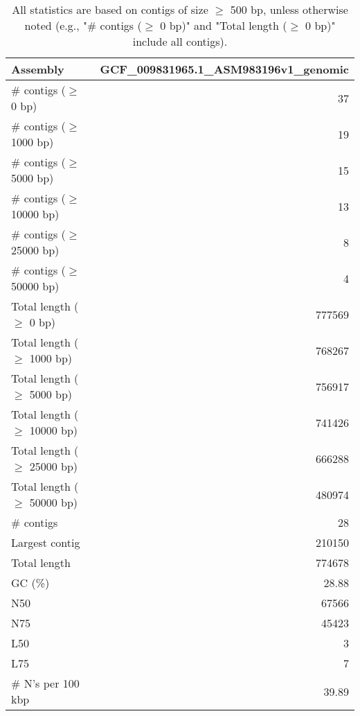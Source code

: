\documentclass[12pt,a4paper]{article}
\begin{document}
\begin{table}[ht]
\begin{center}
\caption{All statistics are based on contigs of size $\geq$ 500 bp, unless otherwise noted (e.g., "\# contigs ($\geq$ 0 bp)" and "Total length ($\geq$ 0 bp)" include all contigs).}
\begin{tabular}{|l*{1}{|r}|}
\hline
Assembly & GCF\_009831965.1\_ASM983196v1\_genomic \\ \hline
\# contigs ($\geq$ 0 bp) & 37 \\ \hline
\# contigs ($\geq$ 1000 bp) & 19 \\ \hline
\# contigs ($\geq$ 5000 bp) & 15 \\ \hline
\# contigs ($\geq$ 10000 bp) & 13 \\ \hline
\# contigs ($\geq$ 25000 bp) & 8 \\ \hline
\# contigs ($\geq$ 50000 bp) & 4 \\ \hline
Total length ($\geq$ 0 bp) & 777569 \\ \hline
Total length ($\geq$ 1000 bp) & 768267 \\ \hline
Total length ($\geq$ 5000 bp) & 756917 \\ \hline
Total length ($\geq$ 10000 bp) & 741426 \\ \hline
Total length ($\geq$ 25000 bp) & 666288 \\ \hline
Total length ($\geq$ 50000 bp) & 480974 \\ \hline
\# contigs & 28 \\ \hline
Largest contig & 210150 \\ \hline
Total length & 774678 \\ \hline
GC (\%) & 28.88 \\ \hline
N50 & 67566 \\ \hline
N75 & 45423 \\ \hline
L50 & 3 \\ \hline
L75 & 7 \\ \hline
\# N's per 100 kbp & 39.89 \\ \hline
\end{tabular}
\end{center}
\end{table}
\end{document}
